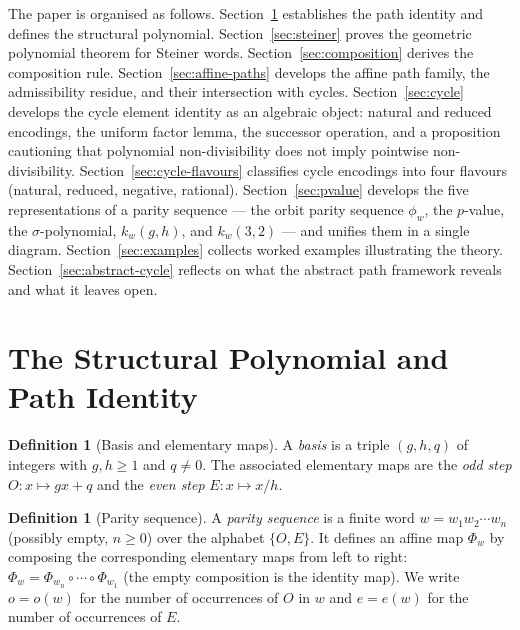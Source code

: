 \documentclass[12pt]{article}
\theoremstyle{definition}
\newtheorem{definition}[theorem]{Definition}
\theoremstyle{remark}
\newcommand{\kpoly}{k}
\begin{document}
The paper is organised as follows.  Section~\ref{sec:path} establishes the
path identity and defines the structural polynomial.  Section~\ref{sec:steiner}
proves the geometric polynomial theorem for Steiner words.
Section~\ref{sec:composition} derives the composition rule.
Section~\ref{sec:affine-paths} develops the affine path family, the
admissibility residue, and their intersection with cycles.
Section~\ref{sec:cycle} develops the cycle element identity as an algebraic
object: natural and reduced encodings, the uniform factor lemma, the successor
operation, and a proposition cautioning that polynomial non-divisibility does
not imply pointwise non-divisibility.
Section~\ref{sec:cycle-flavours} classifies cycle encodings into four flavours
(natural, reduced, negative, rational).
Section~\ref{sec:pvalue} develops the five representations of a parity
sequence --- the orbit parity sequence $\phi_w$, the $p$-value, the
$\sigma$-polynomial, $\kpoly_w(g,h)$, and $\kpoly_w(3,2)$ --- and unifies
them in a single diagram.
Section~\ref{sec:examples} collects worked examples illustrating the theory.
Section~\ref{sec:abstract-cycle} reflects on what the abstract path framework
reveals and what it leaves open.

\section{The Structural Polynomial and Path Identity}
\label{sec:path}

\begin{definition}[Basis and elementary maps]
A \emph{basis} is a triple $(g, h, q)$ of integers with $g, h \geq 1$ and
$q \neq 0$.  The associated elementary maps are the \emph{odd step}
$O\colon x \mapsto gx + q$ and the \emph{even step} $E\colon x \mapsto x/h$.
\end{definition}

\begin{definition}[Parity sequence]
A \emph{parity sequence} is a finite word $w = w_1 w_2 \cdots w_n$ (possibly
empty, $n \geq 0$) over the alphabet $\{O, E\}$.  It defines an affine map
$\Phi_w$ by composing the corresponding elementary maps from left to right:
$\Phi_w = \Phi_{w_n} \circ \cdots \circ \Phi_{w_1}$ (the empty composition
is the identity map).  We write $o = o(w)$ for the number of occurrences of
$O$ in $w$ and $e = e(w)$ for the number of occurrences of $E$.
\end{definition}
\end{document}
